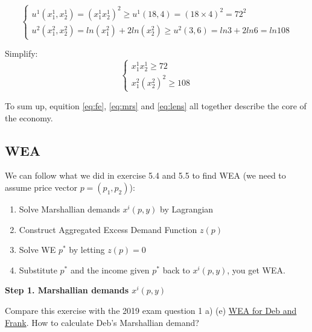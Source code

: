 \documentclass{article}
\begin{document}
\begin{equation}
    \begin{cases}
u^1(x^1_1,x^1_2) = (x^1_1 x^1_2)^2 \ge u^1(18,4) = (18 \times 4)^2=72^2 \\
u^2(x^2_1,x^2_2) = ln(x^2_1) + 2ln(x^2_2) \ge u^2(3,6)=ln3 +2ln6 =ln108
    \end{cases}
    \nonumber
\end{equation}

Simplify:
\begin{equation}
    \begin{cases}
x^1_1 x^1_2 \ge 72 \\
x^2_1 (x^2_2)^2 \ge 108
    \end{cases}
\label{eq:lens}
\end{equation}

To sum up, equition \ref{eq:fe}, \ref{eq:mrs} and \ref{eq:lens} all together  describe the core of the economy.

\newpage
\subsection{WEA}

\begin{mdframed}[backgroundcolor=blue!20,linecolor=white]

We can follow what we did in exercise 5.4 and 5.5 to find WEA
(we need to assume price vector $p=(p_1,p_2)$):

\begin{enumerate}
\item Solve Marshallian demands $x^i(p,y)$ by Lagrangian
\item Construct Aggregated Excess Demand Function $z(p)$ 
\item Solve WE $p^*$ by letting $z(p) = 0$
\item Substitute $p^*$ and the income given $p^*$ back to $x^i(p,y)$, you get WEA.
\end{enumerate}
\end{mdframed}

\textbf{Step 1. Marshallian demands $x^i(p,y)$}

\vspace{3mm}

\begin{mdframed}[backgroundcolor=yellow!20,linecolor=white]
Compare this exercise with the 2019 exam question 1 a) (e) \href{https://www.uio.no/studier/emner/sv/oekonomi/ECON4220/previous-exams/econ32_4220_2019h_sensorveiledning.pdf}{WEA for Deb and Frank}. How to calculate Deb's Marshallian demand?
\end{mdframed}
\end{document}
